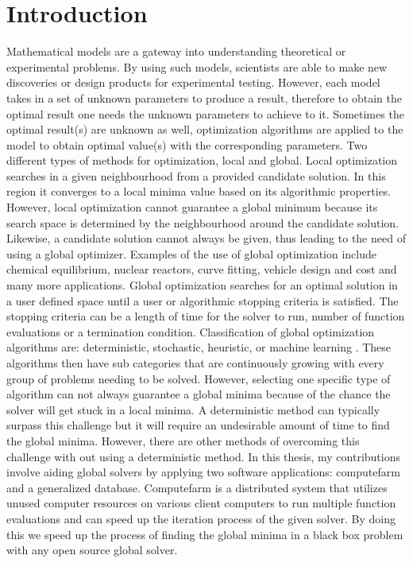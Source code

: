 
\chapter{Introduction}
\label{introduction}

Mathematical models are a gateway into understanding theoretical or experimental problems. By using such models, scientists are able to make new discoveries or design products for experimental testing. However, each model takes in a set of unknown parameters to produce a result, therefore to obtain the optimal result one needs the unknown parameters to achieve to it. Sometimes the optimal result(s) are unknown as well, optimization algorithms are applied to the model to obtain
optimal value(s) with the corresponding parameters.  
Two different types of methods for optimization, local and global. Local optimization searches in a given neighbourhood from a provided
candidate solution. In this region it converges to a local minima value based on its algorithmic properties. However, local optimization cannot guarantee a global minimum because its search space is determined by the neighbourhood  around the candidate solution. Likewise, a candidate solution cannot always be given, thus leading to the need of using a global optimizer.  Examples of the use of global optimization include chemical equilibrium, nuclear reactors, curve fitting, vehicle design and cost \cite{Pinter2002} and many more applications. 
Global optimization searches for an optimal solution in a user defined space until a user or
algorithmic stopping criteria is satisfied. The stopping criteria can be a length of time for the solver to run,
number of function evaluations or a termination condition.
Classification of global optimization algorithms are: deterministic, stochastic, heuristic, or machine learning \cite{Pinter2002}. These algorithms then have sub categories that are continuously growing with every group of problems needing to be solved.    
However, selecting one specific type of algorithm can not always guarantee a global minima because of the chance the solver will get stuck in a local minima. A deterministic method can typically surpass this challenge but it will require an undesirable amount of time to find the global minima. 
However, there are other methods of overcoming this challenge with out using a deterministic method. 
In this thesis, my contributions involve aiding global solvers by applying two software applications: computefarm
and a generalized database. 
Computefarm is a distributed system that utilizes unused computer resources on various client computers to run multiple function evaluations and can speed up the iteration process of the given solver. By doing this we speed up the process of finding the global minima in a black box problem with any open source global solver. 
